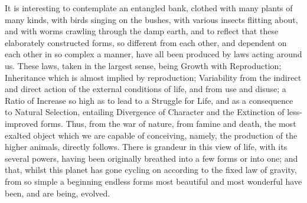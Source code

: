 It is interesting to contemplate an entangled bank, clothed with many
plants of many kinds, with birds singing on the bushes, with various
insects flitting about, and with worms crawling through the damp earth,
and to reflect that these elaborately constructed forms, so different
from each other, and dependent on each other in so complex a manner,
have all been produced by laws acting around us. These laws, taken in
the largest sense, being Growth with Reproduction; Inheritance which is
almost implied by reproduction; Variability from the indirect and
direct action of the external conditions of life, and from use and
disuse; a Ratio of Increase so high as to lead to a Struggle for Life,
and as a consequence to Natural Selection, entailing Divergence of
Character and the Extinction of less-improved forms. Thus, from the war
of nature, from famine and death, the most exalted object which we are
capable of conceiving, namely, the production of the higher animals,
directly follows. There is grandeur in this view of life, with its
several powers, having been originally breathed into a few forms or
into one; and that, whilst this planet has gone cycling on according to
the fixed law of gravity, from so simple a beginning endless forms most
beautiful and most wonderful have been, and are being, evolved.
